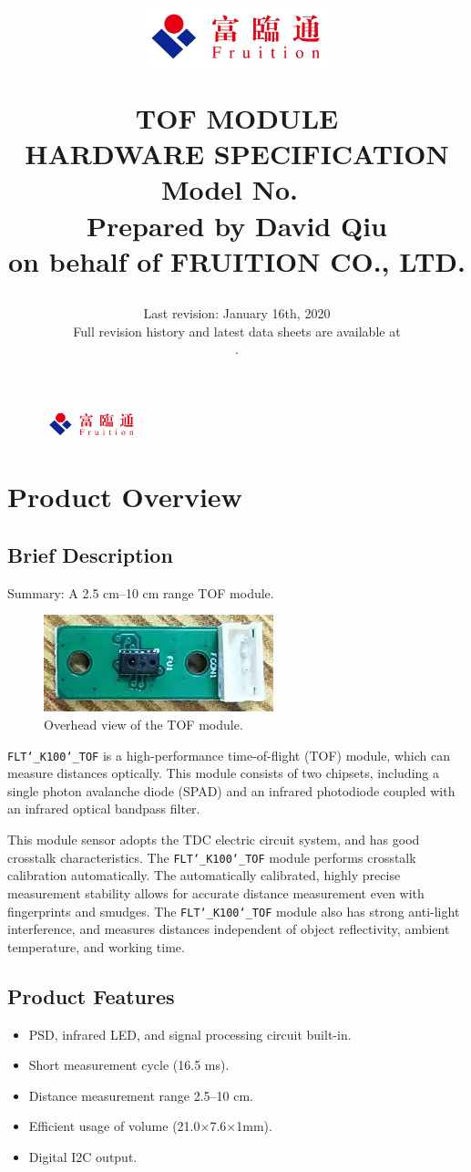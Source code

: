 \documentclass{scrreprt}
\title{
	\begin{figure}[H]
		\centering\includegraphics[width=0.5\textwidth]{logo.jpeg}
	\end{figure}
	\vspace{1cm}
	\flushright
	\Huge{TOF MODULE}\\
	\Huge{HARDWARE SPECIFICATION}\\
	\vspace{2cm}
	\huge{Model No.\ \modelno}\\
	\vspace{2cm}
	\LARGE{Prepared by David Qiu \\ on behalf of FRUITION CO., LTD.}
}
\date{
	Last revision: January 16th, 2020\\
	\vspace{0.5cm}
	Full revision history and latest data sheets are available at\\
	\vspace{0.25cm}
	\upstream.
}
\newcommand{\pchapter}[1]{
	\begingroup\let\clearpage\relax
	\newpage
	\begin{figure}[H]
		\includegraphics[width=0.25\textwidth]{logo.jpeg}
	\end{figure}
	\chapter{#1}
	\endgroup
}
\newcommand{\modelno}{%
	\texttt{FLT\char`_K100\char`_TOF}
}
\newcommand{\x}{$\times$}
\begin{document}
\begin{CJK*}{UTF8}{gbsn}
\maketitle
\tableofcontents

\pchapter{Product Overview}
\section{Brief Description}
Summary: A 2.5 cm--10 cm range TOF module.

\begin{figure}[H]
\center\includegraphics{tof-picture.png}
\caption{Overhead view of the TOF module.}
\end{figure}

\modelno is a high-performance time-of-flight (TOF) module, which can measure
distances optically. This module consists of two chipsets, including a single
photon avalanche diode (SPAD) and an infrared photodiode coupled with an
infrared optical bandpass filter.

This module sensor adopts the TDC electric circuit system, and has good
crosstalk characteristics. The \modelno module performs crosstalk calibration
automatically. The automatically calibrated, highly precise measurement
stability allows for accurate distance measurement even with fingerprints and
smudges. The \modelno module also has strong anti-light interference, and
measures distances independent of object reflectivity, ambient temperature, and
working time.
\section{Product Features}
\begin{itemize}
	\item PSD, infrared LED, and signal processing circuit built-in.
	\item Short measurement cycle (16.5 ms).
	\item Distance measurement range 2.5--10 cm.
	\item Efficient usage of volume (21.0\x7.6\x1mm).
	\item Digital I2C output.
\end{itemize}


\end{CJK*}
\end{document}
